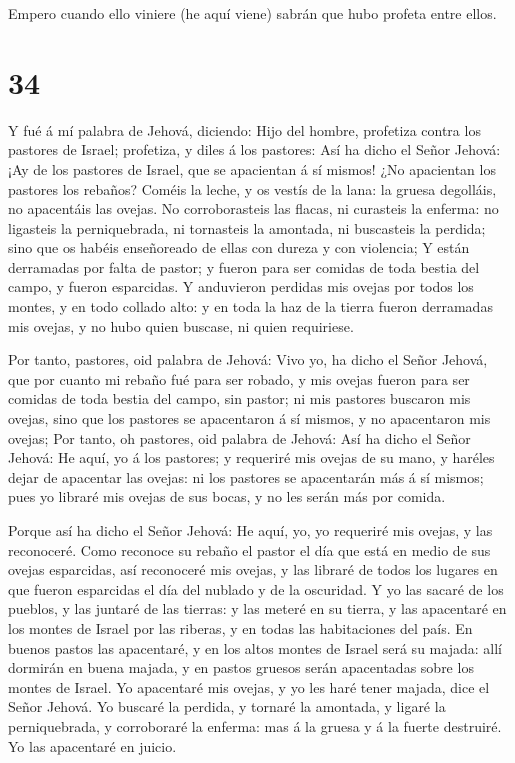  Empero cuando ello viniere (he aquí viene) sabrán que hubo
profeta entre ellos.

\hypertarget{section-33}{%
\section{34}\label{section-33}}

 Y fué á mí palabra de Jehová, diciendo:  Hijo
del hombre, profetiza contra los pastores de Israel; profetiza, y diles
á los pastores: Así ha dicho el Señor Jehová: ¡Ay de los pastores de
Israel, que se apacientan á sí mismos! ¿No apacientan los pastores los
rebaños?  Coméis la leche, y os vestís de la lana: la gruesa
degolláis, no apacentáis las ovejas.  No corroborasteis las
flacas, ni curasteis la enferma: no ligasteis la perniquebrada, ni
tornasteis la amontada, ni buscasteis la perdida; sino que os habéis
enseñoreado de ellas con dureza y con violencia;  Y están
derramadas por falta de pastor; y fueron para ser comidas de toda bestia
del campo, y fueron esparcidas.  Y anduvieron perdidas mis
ovejas por todos los montes, y en todo collado alto: y en toda la haz de
la tierra fueron derramadas mis ovejas, y no hubo quien buscase, ni
quien requiriese.

 Por tanto, pastores, oid palabra de Jehová: 
Vivo yo, ha dicho el Señor Jehová, que por cuanto mi rebaño fué para ser
robado, y mis ovejas fueron para ser comidas de toda bestia del campo,
sin pastor; ni mis pastores buscaron mis ovejas, sino que los pastores
se apacentaron á sí mismos, y no apacentaron mis ovejas; 
Por tanto, oh pastores, oid palabra de Jehová:  Así ha
dicho el Señor Jehová: He aquí, yo á los pastores; y requeriré mis
ovejas de su mano, y haréles dejar de apacentar las ovejas: ni los
pastores se apacentarán más á sí mismos; pues yo libraré mis ovejas de
sus bocas, y no les serán más por comida.

 Porque así ha dicho el Señor Jehová: He aquí, yo, yo
requeriré mis ovejas, y las reconoceré.  Como reconoce su
rebaño el pastor el día que está en medio de sus ovejas esparcidas, así
reconoceré mis ovejas, y las libraré de todos los lugares en que fueron
esparcidas el día del nublado y de la oscuridad.  Y yo las
sacaré de los pueblos, y las juntaré de las tierras: y las meteré en su
tierra, y las apacentaré en los montes de Israel por las riberas, y en
todas las habitaciones del país.  En buenos pastos las
apacentaré, y en los altos montes de Israel será su majada: allí
dormirán en buena majada, y en pastos gruesos serán apacentadas sobre
los montes de Israel.  Yo apacentaré mis ovejas, y yo les
haré tener majada, dice el Señor Jehová.  Yo buscaré la
perdida, y tornaré la amontada, y ligaré la perniquebrada, y corroboraré
la enferma: mas á la gruesa y á la fuerte destruiré. Yo las apacentaré
en juicio.

